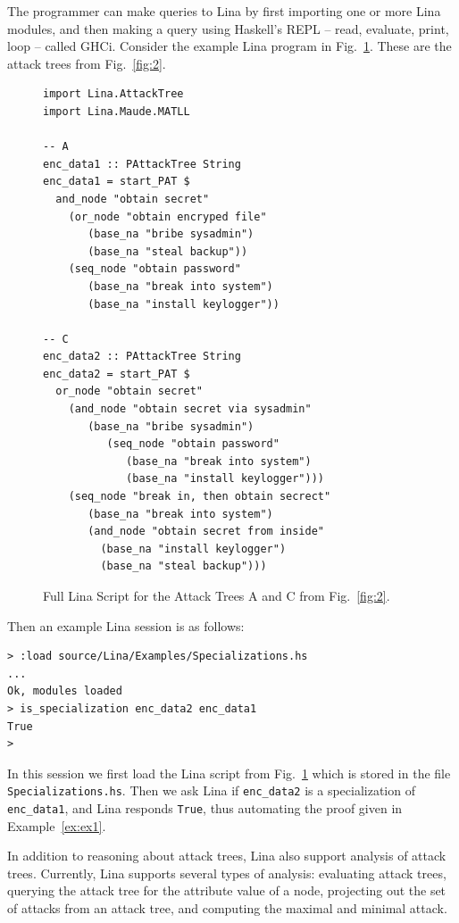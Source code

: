 \documentclass{llncs}
\begin{document}
The programmer can make queries to Lina by first importing one or more
Lina modules, and then making a query using Haskell's REPL -- read,
evaluate, print, loop -- called GHCi.  Consider the example Lina
program in Fig.~\ref{fig:lina-script-encrypt}. These are the attack
trees from Fig.~\ref{fig:2}.
\begin{figure}
  \begin{mdframed}
\begin{verbatim}
import Lina.AttackTree
import Lina.Maude.MATLL

-- A
enc_data1 :: PAttackTree String
enc_data1 = start_PAT $
  and_node "obtain secret"
    (or_node "obtain encryped file"
       (base_na "bribe sysadmin")
       (base_na "steal backup"))
    (seq_node "obtain password"
       (base_na "break into system")
       (base_na "install keylogger"))

-- C
enc_data2 :: PAttackTree String
enc_data2 = start_PAT $
  or_node "obtain secret"
    (and_node "obtain secret via sysadmin"
       (base_na "bribe sysadmin")
          (seq_node "obtain password"
             (base_na "break into system")
             (base_na "install keylogger")))
    (seq_node "break in, then obtain secrect"
       (base_na "break into system")
       (and_node "obtain secret from inside"
         (base_na "install keylogger")
         (base_na "steal backup")))
    \end{verbatim}
  \end{mdframed}
  \caption{Full Lina Script for the Attack Trees A and C from Fig.~\ref{fig:2}.}
  \label{fig:lina-script-encrypt}
\end{figure}
Then an example Lina session is as follows:
\begin{mdframed}\scriptsize
  \begin{verbatim}
> :load source/Lina/Examples/Specializations.hs
...
Ok, modules loaded
> is_specialization enc_data2 enc_data1
True
>     
  \end{verbatim}
\end{mdframed}
In this session we first load the Lina script from
Fig.~\ref{fig:lina-script-encrypt} which is stored in the file
\verb!Specializations.hs!.  Then we ask Lina if \verb!enc_data2! is a
specialization of \verb!enc_data1!, and Lina responds \verb!True!,
thus automating the proof given in Example~\ref{ex:ex1}.

In addition to reasoning about attack trees, Lina also support
analysis of attack trees.  Currently, Lina supports several types of
analysis: evaluating attack trees, querying the attack tree for the
attribute value of a node, projecting out the set of attacks from an
attack tree, and computing the maximal and minimal attack.
\end{document}
